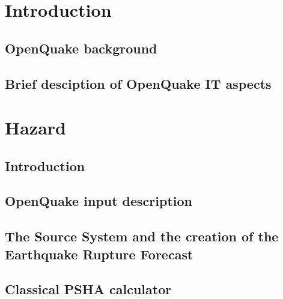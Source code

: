 \documentclass[12pt,a4paper,headings=small,version=first,dvips]{scrbook}
\begin{document}
\part{Introduction}
\chapter{OpenQuake background}
	
\chapter{Brief desciption of OpenQuake IT aspects}
	
\part{Hazard}
\chapter{Introduction}
	
\chapter{OpenQuake input description}
	
\chapter{The Source System and the creation of the Earthquake Rupture 
	Forecast}
	\label{chap:erf}
	
\chapter{Classical PSHA calculator}
	
\end{document}
